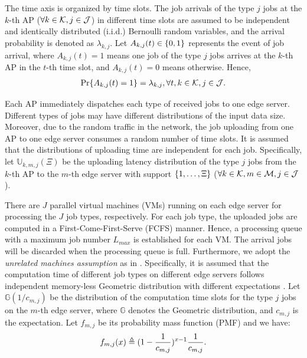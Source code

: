 The time axis is organized by time slots.
The job arrivals of the type $j$ jobs at the $k$-th AP ($\forall k\in\mathcal{K},j\in\mathcal{J}$) in different time slots are assumed to be independent and identically distributed (i.i.d.) Bernoulli random variables, and the arrival probability is denoted as $\lambda_{k,j}$.
Let $A_{k,j}(t) \in \{0,1\}$ represents the event of job arrival, where $A_{k,j}(t)=1$ means one job of the type $j$ jobs arrives at the $k$-th AP in the $t$-th time slot, and $A_{k,j}(t)=0$ means otherwise.
Hence,
\begin{align}
    \Pr\{ A_{k,j}(t) = 1 \} = \lambda_{k,j}, \forall t,k\in\mathcal{K},j\in\mathcal{J}.
\end{align}

Each AP immediately dispatches each type of received jobs to one edge server.
Different types of jobs may have different distributions of the input data size.
Moreover, due to the random traffic in the network, the job uploading from one AP to one edge server consumes a random number of time slots.
It is assumed that the distributions of uploading time are independent for each job.
Specifically, let $\mathbb{U}_{k,m,j}(\Xi)$ be the uploading latency distribution of the type $j$ jobs from the $k$-th AP to the $m$-th edge server with support $\{1, \dots, \Xi\}$ ($\forall k\in\mathcal{K}, m\in\mathcal{M}, j\in\mathcal{J}$).

There are $J$ parallel virtual machines (VMs) running on each edge server for processing the $J$ job types, respectively.
For each job type, the uploaded jobs are computed in a First-Come-First-Serve (FCFS) manner.
Hence, a processing queue with a maximum job number $L_{max}$ is established for each VM.
The arrival jobs will be discarded when the processing queue is full.
Furthermore, we adopt the \emph{unrelated machines assumption} as in \cite{tan-online}.
Specifically, it is assumed that the computation time of different job types on different edge servers follows independent memory-less Geometric distribution with different expectations \cite{TOWC18-HuangKb}.
Let $\mathbb{G}(1/c_{m,j})$ be the distribution of the computation time slots for the type $j$ jobs on the $m$-th edge server, where $\mathbb{G}$ denotes the Geometric distribution, and $c_{m,j}$ is the expectation.
Let $f_{m,j}$ be its probability mass function (PMF) and we have:
\begin{align}
    f_{m,j}(x) \triangleq (1-\frac{1}{c_{m,j}})^{x-1} \frac{1}{c_{m,j}}.
\end{align}

